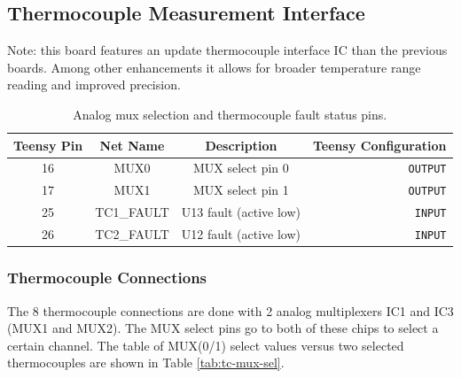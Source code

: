 \documentclass{article}
\begin{document}
\subsection{Thermocouple Measurement Interface}
Note: this board features an update thermocouple interface IC than the previous boards. Among other enhancements it allows for broader temperature range reading and improved precision.
\begin{table}[H]
    \centering
    \begin{tabular}{c|c|c|r}
    Teensy Pin & Net Name  & Description   & Teensy Configuration \\
    \hline 
    16 & MUX0 & MUX select pin 0 & \texttt{OUTPUT} \\
    17 & MUX1 & MUX select pin 1 & \texttt{OUTPUT} \\
    25 & TC1\_FAULT & U13 fault (active low) & \texttt{INPUT} \\
    26 & TC2\_FAULT & U12 fault (active low) & \texttt{INPUT} \\ 
    \end{tabular}
    \caption{Analog mux selection and thermocouple fault status pins.}
    \label{tab:pins_thermo}
\end{table}

\subsubsection{Thermocouple Connections}
The 8 thermocouple connections are done with 2 analog multiplexers IC1 and IC3 (MUX1 and MUX2). The MUX select pins go to both of these chips to select a certain channel. The table of MUX(0/1) select values versus two selected thermocouples are shown in Table \ref{tab:tc-mux-sel}.
\end{document}
